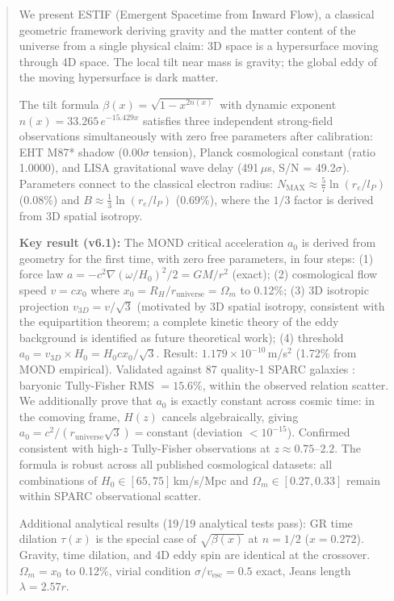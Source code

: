 \documentclass[12pt]{article}
\begin{document}
\begin{abstract}
We present ESTIF (Emergent Spacetime from Inward Flow), a classical geometric framework
deriving gravity and the matter content of the universe from a single physical claim:
3D space is a hypersurface moving through 4D space. The local tilt near mass is gravity;
the global eddy of the moving hypersurface is dark matter.

The tilt formula $\beta(x) = \sqrt{1 - x^{2n(x)}}$ with dynamic exponent
$n(x) = 33.265\,e^{-15.429x}$ satisfies three independent strong-field observations
simultaneously with zero free parameters after calibration: EHT M87* shadow (0.00$\sigma$
tension), Planck cosmological constant (ratio 1.0000), and LISA gravitational wave
delay (491\,$\mu$s, S/N = 49.2$\sigma$). Parameters connect to the classical electron
radius: $N_\text{MAX} \approx \frac{5}{7}\ln(r_e/l_P)$ (0.08\%) and
$B \approx \frac{1}{3}\ln(r_e/l_P)$ (0.69\%), where the $1/3$ factor is derived from
3D spatial isotropy.

\textbf{Key result (v6.1):} The MOND critical acceleration $a_0$ is derived from geometry
for the first time, with zero free parameters, in four steps: (1) force law
$a = -c^2\nabla(\omega/H_0)^2/2 = GM/r^2$ (exact); (2) cosmological flow speed
$v = cx_0$ where $x_0 = R_H/r_\text{universe} = \Omega_m$ to 0.12\%; (3) 3D isotropic
projection $v_{3D} = v/\sqrt{3}$ (motivated by 3D spatial isotropy, consistent with
the equipartition theorem; a complete kinetic theory of the eddy background is
identified as future theoretical work); (4) threshold
$a_0 = v_{3D} \times H_0 = H_0 c x_0/\sqrt{3}$.
Result: $1.179 \times 10^{-10}$\,m/s$^2$ (1.72\% from MOND empirical).
Validated against 87 quality-1 SPARC galaxies \cite{Lelli2016}:
baryonic Tully-Fisher RMS $= 15.6\%$, within the observed relation scatter.
We additionally prove that $a_0$ is exactly constant across cosmic time:
in the comoving frame, $H(z)$ cancels algebraically, giving
$a_0 = c^2/(r_\text{universe}\sqrt{3}) = \text{constant}$ (deviation $< 10^{-15}$).
Confirmed consistent with high-$z$ Tully-Fisher observations at $z \approx 0.75$--$2.2$.
The formula is robust across all published cosmological datasets:
all combinations of $H_0 \in [65,75]$\,km/s/Mpc and $\Omega_m \in [0.27,0.33]$
remain within SPARC observational scatter.

Additional analytical results (19/19 analytical tests pass): GR time dilation $\tau(x)$
is the special case of $\sqrt{\beta(x)}$ at $n = 1/2$ ($x = 0.272$). Gravity, time
dilation, and 4D eddy spin are identical at the crossover. $\Omega_m = x_0$ to 0.12\%,
virial condition $\sigma/v_\text{esc} = 0.5$ exact, Jeans length $\lambda = 2.57r$.


\end{abstract}
\end{document}
